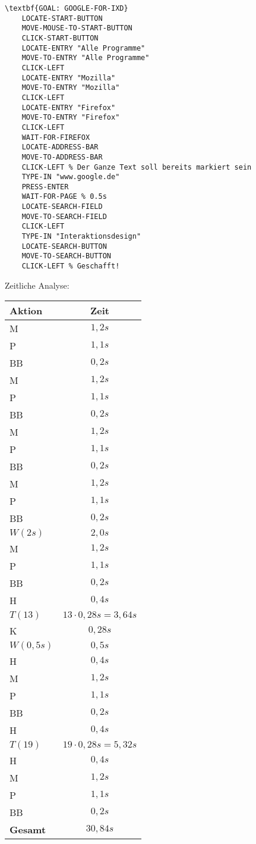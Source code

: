 \documentclass[a4paper,10pt]{article}
\begin{document}
\begin{itemize}
\begin{Verbatim}[commandchars=\\\{\}]
\textbf{GOAL: GOOGLE-FOR-IXD}
    LOCATE-START-BUTTON
    MOVE-MOUSE-TO-START-BUTTON
    CLICK-START-BUTTON
    LOCATE-ENTRY "Alle Programme"
    MOVE-TO-ENTRY "Alle Programme"
    CLICK-LEFT
    LOCATE-ENTRY "Mozilla"
    MOVE-TO-ENTRY "Mozilla"
    CLICK-LEFT
    LOCATE-ENTRY "Firefox"
    MOVE-TO-ENTRY "Firefox"
    CLICK-LEFT
    WAIT-FOR-FIREFOX
    LOCATE-ADDRESS-BAR
    MOVE-TO-ADDRESS-BAR
    CLICK-LEFT % Der Ganze Text soll bereits markiert sein
    TYPE-IN "www.google.de"
    PRESS-ENTER
    WAIT-FOR-PAGE % 0.5s
    LOCATE-SEARCH-FIELD
    MOVE-TO-SEARCH-FIELD
    CLICK-LEFT
    TYPE-IN "Interaktionsdesign"
    LOCATE-SEARCH-BUTTON
    MOVE-TO-SEARCH-BUTTON
    CLICK-LEFT % Geschafft!
\end{Verbatim}

Zeitliche Analyse:
\begin{center}
    \begin{tabular}{|l|c|}
    \hline
    Aktion & Zeit \\
    \hline
    M       & $1,2s$ \\
    P       & $1,1s$ \\
    BB      & $0,2s$ \\
    M       & $1,2s$ \\
    P       & $1,1s$ \\
    BB      & $0,2s$ \\
    M       & $1,2s$ \\
    P       & $1,1s$ \\
    BB      & $0,2s$ \\
    M       & $1,2s$ \\
    P       & $1,1s$ \\
    BB      & $0,2s$ \\
    $W(2s)$ & $2,0s$ \\
    M       & $1,2s$ \\
    P       & $1,1s$ \\
    BB      & $0,2s$ \\
    H       & $0,4s$ \\
    $T(13)$ & $13 \cdot 0,28s = 3,64s$ \\
    K       & $0,28s$ \\
    $W(0,5s)$ & $0,5s$ \\
    H       & $0,4s$ \\
    M       & $1,2s$ \\
    P       & $1,1s$ \\
    BB      & $0,2s$ \\
    H       & $0,4s$ \\
    $T(19)$ & $19 \cdot 0,28s = 5,32s $ \\
    H       & $0,4s$ \\
    M       & $1,2s$ \\
    P       & $1,1s$ \\
    BB      & $0,2s$ \\
    \hline
    \hline
    \textbf{Gesamt} & $30,84s$ \\
    \hline
    \end{tabular}
\end{center}


\end{itemize}
\end{document}
